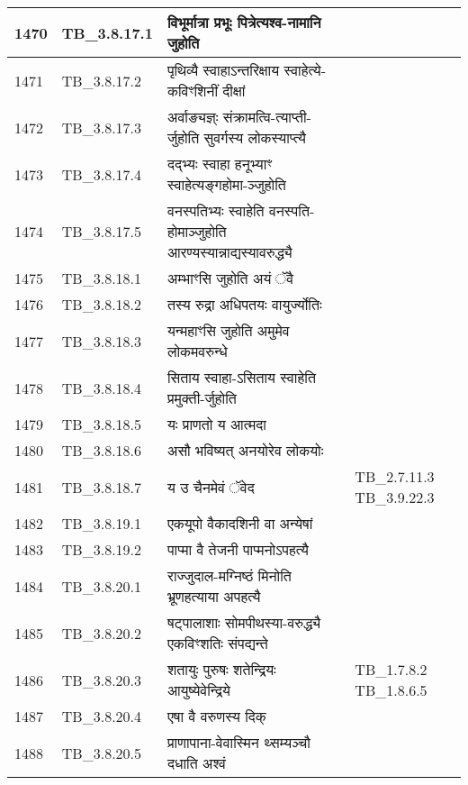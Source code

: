 \documentclass[17pt]{extarticle}
\begin{document}
\begin{longtable}{||p{0.4in}||p{0.9in}||p{4.0in}||p{0.9in}||}
        \hline
            1470 & TB\_3.8.17.1 & विभूर्मात्रा प्रभूः पित्रेत्यश्व{-}नामानि जुहोति &      \\
        \hline
            1471 & TB\_3.8.17.2 & पृथिव्यै स्वाहाऽन्तरिक्षाय स्वाहेत्ये{-}कविꣳशिनीं दीक्षां &      \\
        \hline
            1472 & TB\_3.8.17.3 & अर्वाङ्यज्ञ्ः संक्रामत्वि{-}त्याप्ती{-}र्जुहोति सुवर्गस्य लोकस्याप्त्यै &      \\
        \hline
            1473 & TB\_3.8.17.4 & दद्भ्यः स्वाहा हनूभ्याꣳ स्वाहेत्यङ्गहोमा{-}ञ्जुहोति &      \\
        \hline
            1474 & TB\_3.8.17.5 & वनस्पतिभ्यः स्वाहेति वनस्पति{-}होमाञ्जुहोति आरण्यस्यान्नाद्यस्यावरुद्ध्यै &      \\
        \hline
            1475 & TB\_3.8.18.1 & अम्भाꣳसि जुहोति अयं ॅवै &      \\
        \hline
            1476 & TB\_3.8.18.2 & तस्य रुद्रा अधिपतयः वायुर्ज्योतिः &      \\
        \hline
            1477 & TB\_3.8.18.3 & यन्महाꣳसि जुहोति अमुमेव लोकमवरुन्धे &      \\
        \hline
            1478 & TB\_3.8.18.4 & सिताय स्वाहा{-}ऽसिताय स्वाहेति प्रमुक्ती{-}र्जुहोति &      \\
        \hline
            1479 & TB\_3.8.18.5 & यः प्राणतो य आत्मदा &      \\
        \hline
            1480 & TB\_3.8.18.6 & असौ भविष्यत् अनयोरेव लोकयोः &      \\
        \hline
            1481 & TB\_3.8.18.7 & य उ चैनमेवं ॅवेद & TB\_2.7.11.3  TB\_3.9.22.3       \\
        \hline
            1482 & TB\_3.8.19.1 & एकयूपो वैकादशिनी वा अन्येषां &      \\
        \hline
            1483 & TB\_3.8.19.2 & पाप्मा वै तेजनी पाप्मनोऽपहत्यै &      \\
        \hline
            1484 & TB\_3.8.20.1 & राज्जुदाल{-}मग्निष्ठं मिनोति भ्रूणहत्याया अपहत्यै &      \\
        \hline
            1485 & TB\_3.8.20.2 & षट्पालाशाः सोमपीथस्या{-}वरुद्ध्यै एकविꣳशतिः संपद्यन्ते &      \\
        \hline
            1486 & TB\_3.8.20.3 & शतायुः पुरुषः शतेन्द्रियः आयुष्येवेन्द्रिये & TB\_1.7.8.2 TB\_1.8.6.5        \\
        \hline
            1487 & TB\_3.8.20.4 & एषा वै वरुणस्य दिक् &      \\
        \hline
            1488 & TB\_3.8.20.5 & प्राणापाना{-}वेवास्मिन थ्सम्यञ्चौ दधाति अश्वं &      \\

\end{longtable}
\end{document}
